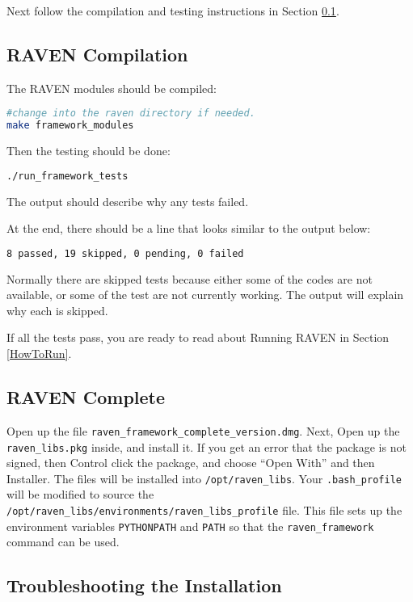 Next follow the compilation and testing instructions in Section
\ref{raven_compilation}.

\subsection{RAVEN Compilation}
\label{raven_compilation}

The RAVEN modules should be compiled:

\begin{lstlisting}[language=bash]
#change into the raven directory if needed.
make framework_modules
\end{lstlisting}

Then the testing should be done:

\begin{lstlisting}[language=bash]
  ./run_framework_tests
\end{lstlisting}

The output should describe why any tests failed.

At the end, there should be a line that looks similar to the output below:
\begin{lstlisting}[language=bash]
8 passed, 19 skipped, 0 pending, 0 failed
\end{lstlisting}

Normally there are skipped tests because either some of the codes are
not available, or some of the test are not currently working.  The
output will explain why each is skipped.

If all the tests pass, you are ready to read about Running RAVEN in
Section \ref{HowToRun}.

\subsection{RAVEN Complete}
\label{raven_complete}

Open up the file \texttt{raven\_framework\_complete\_version.dmg}.
%
Next, Open up the \texttt{raven\_libs.pkg} inside, and install it.  If
you get an error that the package is not signed, then Control click
the package, and choose ``Open With'' and then Installer.
%
The files will be installed into \texttt{/opt/raven\_libs}.
%
Your \texttt{.bash\_profile} will be modified to source the
\texttt{/opt/raven\_libs/environments/raven\_libs\_profile} file.
%
This file sets up the environment variables \texttt{PYTHONPATH} and
\texttt{PATH} so that the \texttt{raven\_framework} command can be used.

\subsection{Troubleshooting the Installation}

